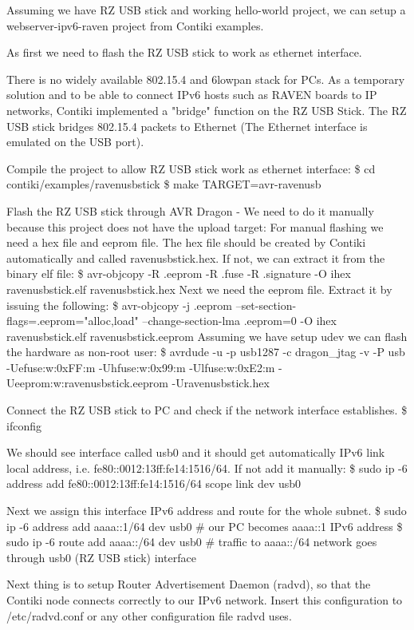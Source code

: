 \documentclass{article}
\begin{document}
Assuming we have RZ USB stick and working hello-world project, we can setup a webserver-ipv6-raven project from Contiki examples.

As first we need to flash the RZ USB stick to work as ethernet interface.

There is no widely available 802.15.4 and 6lowpan stack for PCs.
As a temporary solution and to be able to connect IPv6 hosts such as RAVEN boards to IP networks,
Contiki implemented a "bridge" function on the RZ USB Stick.
The RZ USB stick bridges 802.15.4 packets to Ethernet (The Ethernet interface is emulated on the USB port).


Compile the project to allow RZ USB stick work as ethernet interface:
\$ cd contiki/examples/ravenusbstick
\$ make TARGET=avr-ravenusb

Flash the RZ USB stick through AVR Dragon - We need to do it manually because this project does not have the upload target:
For manual flashing we need a hex file and eeprom file. The hex file should be created by Contiki automatically and called ravenusbstick.hex.
If not, we can extract it from the binary elf file:
\$ avr-objcopy -R .eeprom -R .fuse -R .signature -O ihex ravenusbstick.elf ravenusbstick.hex
Next we need the eeprom file. Extract it by issuing the following:
\$ avr-objcopy -j .eeprom --set-section-flags=.eeprom="alloc,load" --change-section-lma .eeprom=0 -O ihex ravenusbstick.elf ravenusbstick.eeprom
Assuming we have setup udev we can flash the hardware as non-root user:
\$ avrdude -u -p usb1287 -c dragon\_jtag -v -P usb -Uefuse:w:0xFF:m -Uhfuse:w:0x99:m -Ulfuse:w:0xE2:m -Ueeprom:w:ravenusbstick.eeprom -Uravenusbstick.hex


Connect the RZ USB stick to PC and check if the network interface establishes.
\$ ifconfig

We should see interface called usb0 and it should get automatically IPv6 link local address, i.e. fe80::0012:13ff:fe14:1516/64.
If not add it manually:
\$ sudo ip -6 address add fe80::0012:13ff:fe14:1516/64 scope link dev usb0

Next we assign this interface IPv6 address and route for the whole subnet.
\$ sudo ip -6 address add aaaa::1/64 dev usb0   \# our PC becomes aaaa::1 IPv6 address
\$ sudo ip -6 route add aaaa::/64 dev usb0      \# traffic to aaaa::/64 network goes through usb0 (RZ USB stick) interface


Next thing is to setup Router Advertisement Daemon (radvd), so that the Contiki node connects correctly to our IPv6 network.
Insert this configuration to /etc/radvd.conf or any other configuration file radvd uses.
\end{document}
